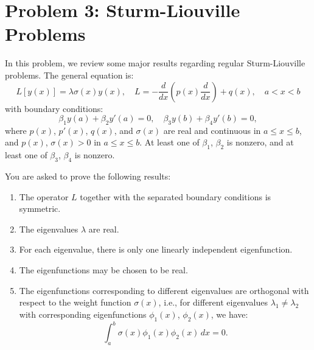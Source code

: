 \documentclass{article}
\begin{document}
\section*{Problem 3: Sturm-Liouville Problems}

In this problem, we review some major results regarding regular Sturm-Liouville problems. The general equation is:
\[
L[y(x)] = \lambda \sigma(x) y(x), \quad L = -\frac{d}{dx} \left( p(x) \frac{d}{dx} \right) + q(x), \quad a < x < b
\]
with boundary conditions:
\[
\beta_1 y(a) + \beta_2 y'(a) = 0, \quad \beta_3 y(b) + \beta_4 y'(b) = 0,
\]
where $p(x)$, $p'(x)$, $q(x)$, and $\sigma(x)$ are real and continuous in $a \leq x \leq b$, and $p(x)$, $\sigma(x) > 0$ in $a \leq x \leq b$. At least one of $\beta_1$, $\beta_2$ is nonzero, and at least one of $\beta_3$, $\beta_4$ is nonzero.

You are asked to prove the following results:

\begin{enumerate}[label=(\arabic*)]
    \item The operator $L$ together with the separated boundary conditions is symmetric.
    
    \item The eigenvalues $\lambda$ are real.
    
    \item For each eigenvalue, there is only one linearly independent eigenfunction.
    
    \item The eigenfunctions may be chosen to be real.
    
    \item The eigenfunctions corresponding to different eigenvalues are orthogonal with respect to the weight function $\sigma(x)$, i.e., for different eigenvalues $\lambda_1 \neq \lambda_2$ with corresponding eigenfunctions $\phi_1(x)$, $\phi_2(x)$, we have:
    \[
    \int_a^b \sigma(x) \phi_1(x) \phi_2(x) \, dx = 0.
    \]
\end{enumerate}
\end{document}

